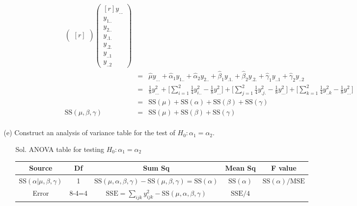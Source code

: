 \documentclass[12pt]{article} %
\begin{document}
\begin{enumerate}
\begin{itemize}
\begin{itemize}
\begin{eqnarray*}
\begin{pmatrix}[r]
		     \end{pmatrix}
		     \begin{pmatrix}[r]
				y_{...} \\
				y_{1..} \\
				y_{2..} \\
				y_{.1.} \\
				y_{.2.} \\
				y_{..1} \\
				y_{..2} 					     
		     \end{pmatrix}\\
		     &=&\hat{\mu}y_{...}+\hat{\alpha}_{1}y_{1..}+\hat{\alpha}_{2}y_{2..}+
		     \hat{\beta}_{1}y_{.1.}+\hat{\beta}_{2}y_{.2.}+\hat{\gamma}_{1}y_{..1}+\hat{\gamma}_{2}y_{..2}\\
		     &=&\frac{1}{8}y_{...}^{2}+\big [\sum_{i=1}^{2}\frac{1}{4}y_{i..}^{2}-\frac{1}{8}y_{...}^{2} \big]
		        +\big [\sum_{j=1}^{2}\frac{1}{4}y_{.j.}^{2}-\frac{1}{8}y_{...}^{2} \big]
		        +\big [\sum_{k=1}^{2}\frac{1}{4}y_{..k}^{2}-\frac{1}{8}y_{...}^{2} \big]\\
		     &=& \mathrm{SS}(\mu)+\mathrm{SS}(\alpha)+\mathrm{SS}(\beta)+\mathrm{SS}(\gamma)\\
		     \mathrm{SS}(\mu,\beta,\gamma)&=& \mathrm{SS}(\mu)+\mathrm{SS}(\beta)+\mathrm{SS}(\gamma)\\
		    \end{eqnarray*}
   		  \end{itemize}	    	   
	   \item[(e)] Construct an analysis of variance table for the test of $H_{0}:\alpha_{1}=\alpha_{2}$.
	      \begin{itemize}
		    \item[Sol.] ANOVA table for testing $H_{0}:\alpha_{1}=\alpha_{2}$ %
		  	\begin{table}[ht]
				\begin{center}
				\begin{tabular}{ccccc}
				  \hline
				 Source & Df & Sum Sq & Mean Sq & F value \\ 
				  \hline
				 $\mathrm{SS}(\alpha|\mu,\beta,\gamma)$ & 1 
				 & $\mathrm{SS}(\mu,\alpha,\beta,\gamma)-\mathrm{SS}(\mu,\beta,\gamma)=\mathrm{SS}(\alpha)$ 
				 & $\mathrm{SS}(\alpha)$ & $\mathrm{SS}(\alpha)/\mathrm{MSE}$  \\ 
				Error & 8-4=4 & $\mathrm{SSE}=\sum_{ijk}y_{ijk}^{2}-\mathrm{SS}(\mu,\alpha,\beta,\gamma)$
				& $\mathrm{SSE}/4$ &   \\ 

\end{tabular}
\end{center}
\end{table}
\end{itemize}
\end{itemize}
\end{enumerate}
\end{document}
